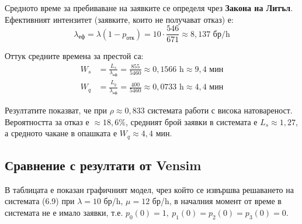 Средното време за пребиваване на заявките се определя чрез \textbf{Закона на Литъл}.
Ефективният интензитет (заявките, които не получават отказ) е:
\begin{equation}
	\lambda_{\text{еф}} = \lambda (1 - p_{\text{отк}}) = 10 \cdot \frac{546}{671} \approx 8{,}137 \text{ бр/h} \tag{3}
\end{equation}

Оттук средните времена за престой са:
\begin{align*}
	W_s &= \frac{L_s}{\lambda_{\text{еф}}} = \frac{855}{5460} \approx 0{,}1566 \text{ h} \approx 9{,}4 \text{ мин} \\[4pt]
	W_q &= \frac{L_q}{\lambda_{\text{еф}}} = \frac{400}{5460} \approx 0{,}0733 \text{ h} \approx 4{,}4 \text{ мин}
\end{align*}

Резултатите показват, че при $\rho \approx 0{,}833$ системата работи с висока натовареност. Вероятността за отказ е $\approx 18{,}6\%$, средният брой заявки в системата е $L_s \approx 1{,}27$, а средното чакане в опашката е $W_q \approx 4{,}4$ мин.

\subsection{Сравнение с резултати от Vensim}

В таблицата е показан графичният модел, чрез който се извършва решаването на системата (6.9) при $\lambda=10$ бр/h, $\mu=12$ бр/h, в началния момент от време в системата не е имало заявки, т.е. $p_0(0)=1, \ p_1(0)=p_2(0)=p_3(0)=0$.

